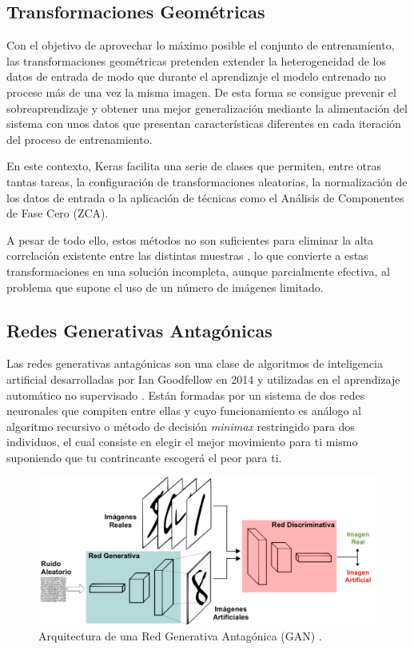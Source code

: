 \subsection{Transformaciones Geométricas} \label{Chapter:GeometricTransformations}

Con el objetivo de aprovechar lo máximo posible el conjunto de entrenamiento, las transformaciones geométricas pretenden extender la heterogeneidad de los datos de entrada de modo que durante el aprendizaje el modelo entrenado no procese más de una vez la misma imagen. De esta forma se consigue prevenir el sobreaprendizaje y obtener una mejor generalización mediante la alimentación del sistema con unos datos que presentan características diferentes en cada iteración del proceso de entrenamiento.

En este contexto, Keras facilita una serie de clases que permiten, entre otras tantas tareas, la configuración de transformaciones aleatorias, la normalización de los datos de entrada o la aplicación de técnicas como el Análisis de Componentes de Fase Cero (ZCA).

A pesar de todo ello, estos métodos no son suficientes para eliminar la alta correlación existente entre las distintas muestras \cite{ZCA}, lo que convierte a estas transformaciones en una solución incompleta, aunque parcialmente efectiva, al problema que supone el uso de un número de imágenes limitado.

\subsection{Redes Generativas Antagónicas} \label{Chapter:GAN}

Las redes generativas antagónicas son una clase de algoritmos de inteligencia artificial desarrolladas por Ian Goodfellow en 2014 y utilizadas en el aprendizaje automático no supervisado \cite{GAN}. Están formadas por un sistema de dos redes neuronales que compiten entre ellas y cuyo funcionamiento es análogo al algoritmo recursivo o método de decisión \textit{minimax} restringido para dos individuos, el cual consiste en elegir el mejor movimiento para ti mismo suponiendo que tu contrincante escogerá el peor para ti. 

\begin{figure}
    \centering
    \includegraphics[width=\textwidth]{Images/GAN.png}
    \caption{Arquitectura de una Red Generativa Antagónica (GAN) \cite{img:GAN}.}
    \label{fig:GAN}
\end{figure}

